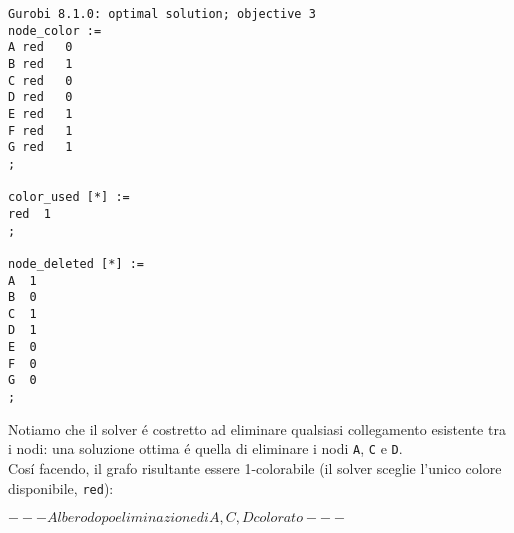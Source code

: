 \documentclass{article}
\begin{document}
\begin{verbatim}
Gurobi 8.1.0: optimal solution; objective 3
node_color :=
A red   0
B red   1
C red   0
D red   0
E red   1
F red   1
G red   1
;

color_used [*] :=
red  1
;

node_deleted [*] :=
A  1
B  0
C  1
D  1
E  0
F  0
G  0
;
\end{verbatim}

Notiamo che il solver \'e costretto ad eliminare qualsiasi collegamento esistente tra i nodi: una soluzione ottima \'e quella di eliminare i nodi \texttt{A}, \texttt{C} e \texttt{D}.\\
Cos\'i facendo, il grafo risultante essere 1-colorabile (il solver sceglie l'unico colore disponibile, \texttt{red}):

$ --- Albero dopo eliminazione di A, C, D colorato --- $
\end{document}
